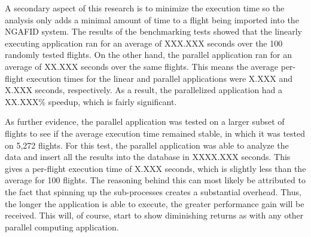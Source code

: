 	A secondary aspect of this research is to minimize the execution time so  the analysis only adds a minimal amount of time to a flight being imported into the NGAFID system.  The results of the benchmarking tests showed that the linearly executing application ran for an average of XXX.XXX seconds over the 100 randomly tested flights.  On the other hand, the parallel application ran for an average of XX.XXX seconds over the same flights.  This means the average per-flight execution times for the linear and parallel applications were X.XXX and X.XXX seconds, respectively.  As a result, the parallelized application had a XX.XXX\% speedup, which is fairly significant.  %
    
    As further evidence, the parallel application was tested on a larger subset of flights to see if the average execution time remained stable, in which it was tested on 5,272 flights.  For this test, the parallel application was able to analyze the data and insert all the results into the database in XXXX.XXX seconds.  This gives a per-flight execution time of X.XXX seconds, which is slightly less than the average for 100 flights.  The reasoning behind this can most likely be attributed to the fact that spinning up the sub-processes creates a substantial overhead.  Thus, the longer the application is able to execute, the greater performance gain will be received.  This will, of course, start to show diminishing returns as with any other parallel computing application.
    
